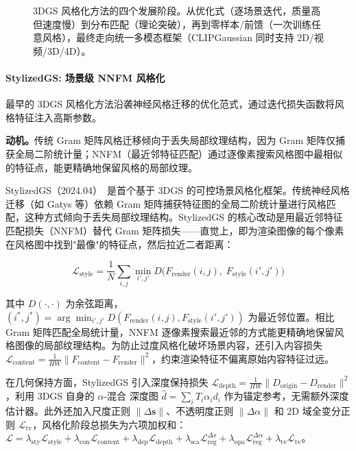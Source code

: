\begin{figure}[htbp]
\centering
\resizebox{0.95\textwidth}{!}{}
\caption{3DGS 风格化方法的四个发展阶段。从优化式（逐场景迭代，质量高但速度慢）到分布匹配（理论突破），再到零样本/前馈（一次训练任意风格），最终走向统一多模态框架（CLIPGaussian 同时支持 2D/视频/3D/4D）。}
\label{fig:ch09_stylization_timeline}
\end{figure}

\paragraph{StylizedGS: 场景级 NNFM 风格化}

最早的 3DGS 风格化方法沿袭神经风格迁移的优化范式，通过迭代损失函数将风格特征注入高斯参数。

\textbf{动机。}传统 Gram 矩阵风格迁移倾向于丢失局部纹理结构，因为 Gram 矩阵仅捕获全局二阶统计量；NNFM（最近邻特征匹配）通过逐像素搜索风格图中最相似的特征点，能更精确地保留风格的局部纹理。

StylizedGS（2024.04）~\cite{2404_05220}是首个基于 3DGS 的可控场景风格化框架。传统神经风格迁移（如 Gatys 等）依赖 Gram 矩阵捕获特征图的全局二阶统计量进行风格匹配，这种方式倾向于丢失局部纹理结构。StylizedGS 的核心改动是用最近邻特征匹配损失（NNFM）替代 Gram 矩阵损失——直觉上，即为渲染图像的每个像素在风格图中找到"最像"的特征点，然后拉近二者距离：

\begin{equation}
\mathcal{L}_{\text{style}} = \frac{1}{N} \sum_{i,j} \min_{i',j'} D\!\bigl(F_{\text{render}}(i,j),\; F_{\text{style}}(i',j')\bigr)
\end{equation}

其中 $D(\cdot,\cdot)$ 为余弦距离，$(i^*,j^*) = \arg\min_{i',j'} D(F_{\text{render}}(i,j), F_{\text{style}}(i',j'))$ 为最近邻位置。相比 Gram 矩阵匹配全局统计量，NNFM 逐像素搜索最近邻的方式能更精确地保留风格图像的局部纹理结构。为防止过度风格化破坏场景内容，还引入内容损失 $\mathcal{L}_{\text{content}} = \frac{1}{HW}\|F_{\text{content}} - F_{\text{render}}\|^2$，约束渲染特征不偏离原始内容特征过远。

在几何保持方面，StylizedGS 引入深度保持损失 $\mathcal{L}_{\text{depth}} = \frac{1}{HW}\|D_{\text{origin}} - D_{\text{render}}\|^2$，利用 3DGS 自身的 $\alpha$-混合 深度图 $\hat{d} = \sum_i T_i \alpha_i d_i$ 作为锚定参考，无需额外深度估计器。此外还加入尺度正则 $\|\Delta \mathbf{s}\|$、不透明度正则 $\|\Delta \alpha\|$ 和 2D 域全变分正则 $\mathcal{L}_{\text{tv}}$，风格化阶段总损失为六项加权和：$\mathcal{L} = \lambda_{\text{sty}}\mathcal{L}_{\text{style}} + \lambda_{\text{con}}\mathcal{L}_{\text{content}} + \lambda_{\text{dep}}\mathcal{L}_{\text{depth}} + \lambda_{\text{sca}}\mathcal{L}_{\text{reg}}^{\Delta s} + \lambda_{\text{opa}}\mathcal{L}_{\text{reg}}^{\Delta \alpha} + \lambda_{\text{tv}}\mathcal{L}_{\text{tv}}$。


